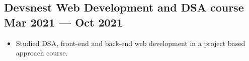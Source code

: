\documentclass[a4,10pt]{article}
\newenvironment{zitemize}{
\begin{itemize}\itemsep0pt \parskip0pt \parsep1pt}
{\end{itemize}\vspace{-0.5cm}}
\begin{document}
    \subsection*{Devsnest Web Development and DSA course \hfill Mar 2021 --- Oct 2021}
\vspace{-0.05cm}
    \begin{zitemize}
    \item Studied DSA, front-end and back-end web development in a project based
approach course.
    \end{zitemize}
\end{document}
